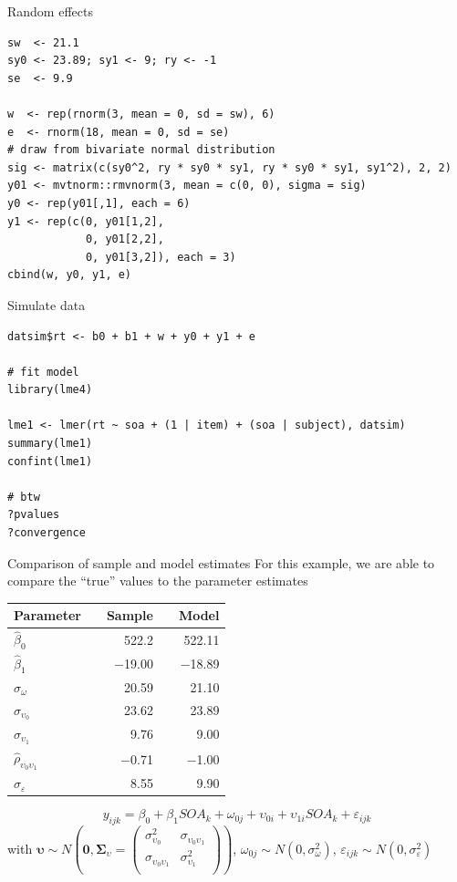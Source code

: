 \documentclass[aspectratio=169]{beamer}
\newcommand{\gvect}[1]{\boldsymbol{#1}}
\newcommand{\gmat}[1]{\boldsymbol{#1}}
\begin{document}
\begin{frame}[fragile]{Random effects}
  \begin{lstlisting}
sw  <- 21.1
sy0 <- 23.89; sy1 <- 9; ry <- -1
se  <- 9.9

w  <- rep(rnorm(3, mean = 0, sd = sw), 6)
e  <- rnorm(18, mean = 0, sd = se)
# draw from bivariate normal distribution
sig <- matrix(c(sy0^2, ry * sy0 * sy1, ry * sy0 * sy1, sy1^2), 2, 2)
y01 <- mvtnorm::rmvnorm(3, mean = c(0, 0), sigma = sig)
y0 <- rep(y01[,1], each = 6)
y1 <- rep(c(0, y01[1,2],
            0, y01[2,2],
            0, y01[3,2]), each = 3)
cbind(w, y0, y1, e)
  \end{lstlisting}
\end{frame}

\begin{frame}[fragile]{Simulate data}
  \begin{lstlisting}
datsim$rt <- b0 + b1 + w + y0 + y1 + e

# fit model
library(lme4)

lme1 <- lmer(rt ~ soa + (1 | item) + (soa | subject), datsim)
summary(lme1)
confint(lme1)

# btw
?pvalues
?convergence
  \end{lstlisting}
\end{frame}

\begin{frame}{Comparison of sample and model estimates}
  For this example, we are able to compare the ``true'' values to the
  parameter estimates
  \begin{center}
  \begin{tabular}{lrrrr}
    \hline
    Parameter && Sample && Model \\
    \hline
    $\hat\beta_0$ && 522.2 && 522.11\\
    $\hat\beta_1$ && $-$19.00 && $-$18.89\\
    $\hat\sigma_{\omega}$ && 20.59 && 21.10\\
    $\hat\sigma_{\upsilon_0}$ && 23.62 && 23.89\\
    $\hat\sigma_{\upsilon_1}$ && 9.76 && 9.00\\
    $\hat\rho_{\upsilon_0\upsilon_1}$ && $-$0.71 && $-$1.00\\
    $\hat\sigma_{\varepsilon}$ && 8.55 && 9.90\\
    \hline
  \end{tabular}
  \end{center}
     \[
       y_{ijk} = \beta_0 + \beta_1 SOA_k + \omega_{0j} + \upsilon_{0i} +
       \upsilon_{1i} SOA_k + \varepsilon_{ijk} 
  \]
\small
with $\gvect{\upsilon} \sim N\left(\gvect{0}, \gmat{\Sigma}_{\upsilon} = 
    \begin{pmatrix}
      \sigma^2_{\upsilon_0} & \sigma_{\upsilon_0\upsilon_1} \\
      \sigma_{\upsilon_0\upsilon_1} & \sigma^2_{\upsilon_1} \\
    \end{pmatrix}\right)$,
  $\omega_{0j} \sim N(0, \sigma_{\omega}^2)$, $\varepsilon_{ijk} \sim N(0,
  \sigma_{\varepsilon}^2)$ 
\end{frame}
\end{document}
